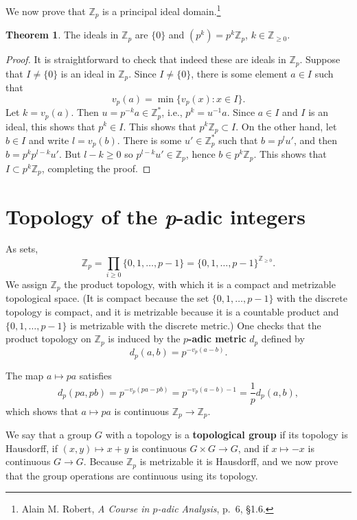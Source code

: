 \documentclass{article}
\theoremstyle{definition}
\newtheorem{theorem}{Theorem}
\theoremstyle{definition}
\begin{document}
We now prove that $\mathbb{Z}_p$ is a principal ideal domain.\footnote{Alain M. Robert, {\em A Course in $p$-adic Analysis},
p.~6, \S 1.6.}

\begin{theorem}
The ideals in $\mathbb{Z}_p$ are $\{0\}$ and $(p^k)=p^k\mathbb{Z}_p$, $k \in \mathbb{Z}_{\geq 0}$. 
\end{theorem}
\begin{proof}
It is straightforward to check that indeed these are ideals in $\mathbb{Z}_p$. Suppose that $I\neq \{0\}$ is an ideal
in
$\mathbb{Z}_p$. Since $I \neq \{0\}$, there is some element $a \in I$ such that
\[
v_p(a) = \min\{v_p(x): x \in I\}.
\]
Let $k=v_p(a)$. Then $u=p^{-k} a \in \mathbb{Z}_p^*$, i.e.,
$p^k=u^{-1} a$.
Since $a \in I$ and $I$ is an ideal, this shows that $p^k \in I$. This shows that
$p^k \mathbb{Z}_p \subset I$.
On the other hand, let $b \in I$ and write
$l=v_p(b)$. There is some $u' \in \mathbb{Z}_p^*$ such that $b=p^l u'$, and then
$b= p^k p^{l-k} u'$. But $l-k \geq 0$ so $p^{l-k} u' \in \mathbb{Z}_p$, hence $b \in p^k \mathbb{Z}_p$. 
This shows that $I \subset p^k \mathbb{Z}_p$, completing the proof.
\end{proof}



\section{Topology of the {\em p}-adic integers}
As sets,
\[
\mathbb{Z}_p = \prod_{i \geq 0} \{0,1,\ldots,p-1\} = \{0,1,\ldots,p-1\}^{\mathbb{Z}_{\geq 0}}.
\]
We assign $\mathbb{Z}_p$ the product topology, with which it is a compact and metrizable topological space.
(It is compact because the set $\{0,1,\ldots,p-1\}$ with the discrete topology is compact, and it is metrizable
because it is a countable product and $\{0,1,\ldots,p-1\}$ is metrizable with the discrete metric.)
One checks that the product topology on $\mathbb{Z}_p$ is induced by the \textbf{$p$-adic metric}
$d_p$ defined by 
\[
d_p(a,b) = p^{-v_p(a-b)}.
\]

The map $a \mapsto pa$ satisfies
\[
d_p(pa,pb) = p^{-v_p(pa-pb)} = p^{-v_p(a-b)-1} = \frac{1}{p}d_p(a,b),
\]
which shows that $a \mapsto pa$ is continuous $\mathbb{Z}_p \to \mathbb{Z}_p$. 

We say that a group $G$ with a topology is a \textbf{topological group} if its topology is Hausdorff, if $(x,y) \mapsto x+y$ is continuous $G \times G \to G$, and if
$x \mapsto -x$ is continuous $G \to G$. Because $\mathbb{Z}_p$ is metrizable it is Hausdorff, and we now prove that the group operations are continuous using its
topology.
\end{document}
